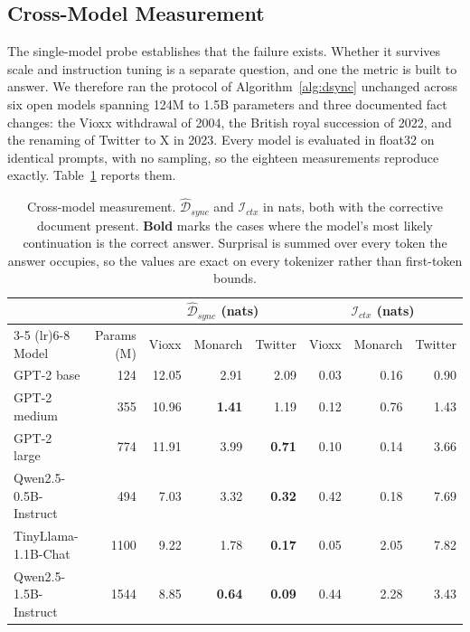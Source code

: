 \documentclass[10pt]{article}
\begin{document}
\subsection{Cross-Model Measurement}
\label{sec:crossmodel}

The single-model probe establishes that the failure exists. Whether it survives
scale and instruction tuning is a separate question, and one the metric is built
to answer. We therefore ran the protocol of Algorithm~\ref{alg:dsync} unchanged
across six open models spanning 124M to 1.5B parameters and three documented
fact changes: the Vioxx withdrawal of 2004, the British royal succession of
2022, and the renaming of Twitter to X in 2023. Every model is evaluated in
float32 on identical prompts, with no sampling, so the eighteen measurements
reproduce exactly. Table~\ref{tab:crossmodel} reports them.

\begin{table}[t]
\centering
\caption{Cross-model measurement. $\widehat{\mathcal{D}}_{sync}$ and
$\mathcal{I}_{ctx}$ in nats, both with the corrective document present.
\textbf{Bold} marks the cases where the model's most likely continuation is the
correct answer. Surprisal is summed over every token the answer occupies, so the
values are exact on every tokenizer rather than first-token bounds.}
\label{tab:crossmodel}
\small
\begin{tabular}{lrrrrrrr}
\toprule
& & \multicolumn{3}{c}{$\widehat{\mathcal{D}}_{sync}$ (nats)}
& \multicolumn{3}{c}{$\mathcal{I}_{ctx}$ (nats)} \\
\cmidrule(lr){3-5} \cmidrule(lr){6-8}
Model & Params (M) & Vioxx & Monarch & Twitter & Vioxx & Monarch & Twitter \\
\midrule
GPT-2 base & 124 & 12.05 & 2.91 & 2.09 & 0.03 & 0.16 & 0.90 \\
GPT-2 medium & 355 & 10.96 & \textbf{1.41} & 1.19 & 0.12 & 0.76 & 1.43 \\
GPT-2 large & 774 & 11.91 & 3.99 & \textbf{0.71} & 0.10 & 0.14 & 3.66 \\
Qwen2.5-0.5B-Instruct & 494 & 7.03 & 3.32 & \textbf{0.32} & 0.42 & 0.18 & 7.69 \\
TinyLlama-1.1B-Chat & 1100 & 9.22 & 1.78 & \textbf{0.17} & 0.05 & 2.05 & 7.82 \\
Qwen2.5-1.5B-Instruct & 1544 & 8.85 & \textbf{0.64} & \textbf{0.09} & 0.44 & 2.28 & 3.43 \\
\bottomrule
\end{tabular}
\end{table}
\end{document}
